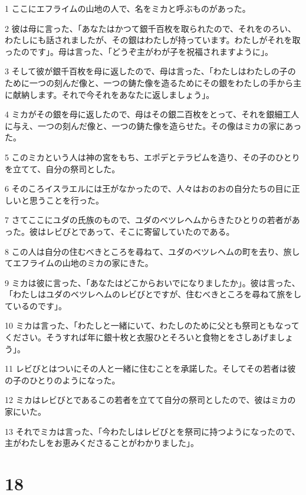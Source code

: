 \par 1 ここにエフライムの山地の人で、名をミカと呼ぶものがあった。
\par 2 彼は母に言った、「あなたはかつて銀千百枚を取られたので、それをのろい、わたしにも話されましたが、その銀はわたしが持っています。わたしがそれを取ったのです」。母は言った、「どうぞ主がわが子を祝福されますように」。
\par 3 そして彼が銀千百枚を母に返したので、母は言った、「わたしはわたしの子のために一つの刻んだ像と、一つの鋳た像を造るためにその銀をわたしの手から主に献納します。それで今それをあなたに返しましょう」。
\par 4 ミカがその銀を母に返したので、母はその銀二百枚をとって、それを銀細工人に与え、一つの刻んだ像と、一つの鋳た像を造らせた。その像はミカの家にあった。
\par 5 このミカという人は神の宮をもち、エポデとテラピムを造り、その子のひとりを立てて、自分の祭司とした。
\par 6 そのころイスラエルには王がなかったので、人々はおのおの自分たちの目に正しいと思うことを行った。
\par 7 さてここにユダの氏族のもので、ユダのベツレヘムからきたひとりの若者があった。彼はレビびとであって、そこに寄留していたのである。
\par 8 この人は自分の住むべきところを尋ねて、ユダのベツレヘムの町を去り、旅してエフライムの山地のミカの家にきた。
\par 9 ミカは彼に言った、「あなたはどこからおいでになりましたか」。彼は言った、「わたしはユダのベツレヘムのレビびとですが、住むべきところを尋ねて旅をしているのです」。
\par 10 ミカは言った、「わたしと一緒にいて、わたしのために父とも祭司ともなってください。そうすれば年に銀十枚と衣服ひとそろいと食物とをさしあげましょう」。
\par 11 レビびとはついにその人と一緒に住むことを承諾した。そしてその若者は彼の子のひとりのようになった。
\par 12 ミカはレビびとであるこの若者を立てて自分の祭司としたので、彼はミカの家にいた。
\par 13 それでミカは言った、「今わたしはレビびとを祭司に持つようになったので、主がわたしをお恵みくださることがわかりました」。

\chapter{18}


